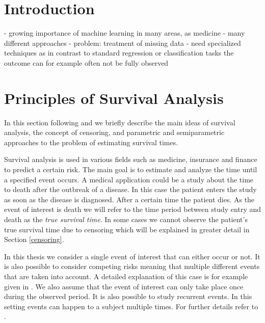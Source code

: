 \documentclass[12pt, a4paper]{scrartcl}
\theoremstyle{definition}
\theoremstyle{plain}
\numberwithin{equation}{section}
\numberwithin{figure}{section}
\numberwithin{table}{section}
\begin{document}
	
	\thispagestyle{plain}
	\tableofcontents
	\newpage

	
	\section{Introduction} \label{introduction}
	- growing importance of machine learning in many areas, as medicine
	- many different approaches
	- problem: treatment of missing data
	- need specialized techniques as in contrast to standard regression or classification tasks the outcome can for example often not be fully observed
	
	\newpage
	
	\section{Principles of Survival Analysis}
		
	In this section following \citet*{sabook} and \citet*{mathsabook} we briefly describe the main ideas of survival analysis, the concept of censoring, and parametric and semiparametric approaches to the problem of estimating survival times.
	
	Survival analysis is used in various fields such as medicine, insurance and finance to predict a certain risk.
	The main goal is to estimate and analyze the time until a specified event occurs.
	A medical application could be a study about the time to death after the outbreak of a disease.
	In this case the patient enters the study as soon as the disease is diagnosed.
	After a certain time the patient dies.
	As the event of interest is death we will refer to the time period between study entry and death as the \emph{true survival time}.
	In some cases we cannot observe the patient's true survival time due to censoring which will be explained in greater detail in Section \ref{censoring}.
	
	In this thesis we consider a single event of interest that can either occur or not.
	It is also possible to consider competing risks meaning that multiple different events that are taken into account.
	A detailed explanation of this case is for example given in \citet*[Chapter~8]{bookfailuretime}.
	We also assume that the event of interest can only take place once during the observed period.
	It is also possible to study recurrent events.
	In this setting events can happen to a subject multiple times.
	For further details refer to \citet*[Chapter~9]{bookfailuretime}.
	
\end{document}
